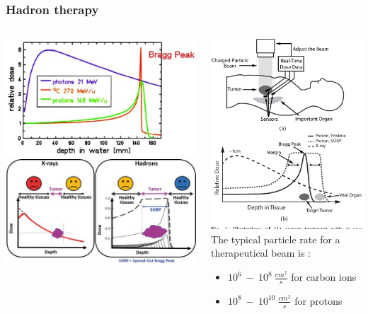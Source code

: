 \documentclass[aspectratio=169]{beamer}
\begin{document}
	\begin{frame}
	\frametitle{Hadron therapy}
	\begin{columns}
		\begin{center}
			\includegraphics[width=0.75 \textwidth]{IMG/Bragg_Peak.PNG}
			\includegraphics[width=0.65 \textwidth]{IMG/Bragg_Peak2.PNG}
		\end{center}
		\begin{center}
			\includegraphics[width=0.3 \textwidth]{IMG/HadroTherapy.PNG}
			\newline
			The typical particle rate for a therapeutical beam is :
			\begin{itemize}
				\item $10^6 \:- \: 10^8 \: \frac{cm^2}{s}$ for carbon ions
				\item $10^8 \:- \: 10^{10} \: \frac{cm^2}{s}$ for protons
			\end{itemize}
		\end{center}
	\end{columns}
	
	\end{frame}
\end{document}
